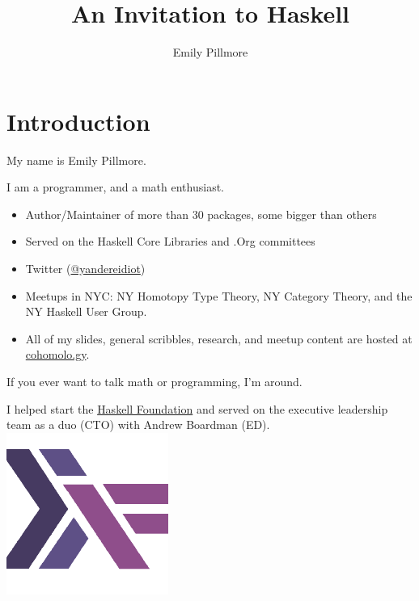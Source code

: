 \documentclass[tikz]{beamer}
\title{An Invitation to Haskell}
\author{Emily Pillmore}
\newcommand{\blue}[1]{\textcolor{blue}{#1}}
\theoremstyle{definition}
\begin{document}
\frame{\titlepage}


 
\section{Introduction}

\frame
{
	My name is Emily Pillmore.
	
	I am a programmer, and a math enthusiast. 
}

\frame
{
	\begin{itemize}
		\item Author/Maintainer of more than 30 packages, some bigger than others
		\item Served on the Haskell Core Libraries and .Org committees
		\item Twitter (\blue{\href{https://twitter.com/yandereidiot}{@yandereidiot}})
		\item Meetups in NYC: NY Homotopy Type Theory, NY Category Theory, and the NY Haskell User Group. 
		\item All of my slides, general scribbles, research, and meetup content are hosted at \blue{\href{https://github.com/cohomolo-gy}{cohomolo.gy}}.
	\end{itemize}
	
	
	If you ever want to talk math or programming, I'm around.
}

\frame
{
	\begin{center}
		I helped start the \blue{\href{https://haskell.foundation}{Haskell Foundation}} and served on the executive leadership team as a duo (CTO) with Andrew Boardman (ED).  \\
		\includegraphics[scale=0.3]{haskell-foundation}
	\end{center}
}
\end{document}
